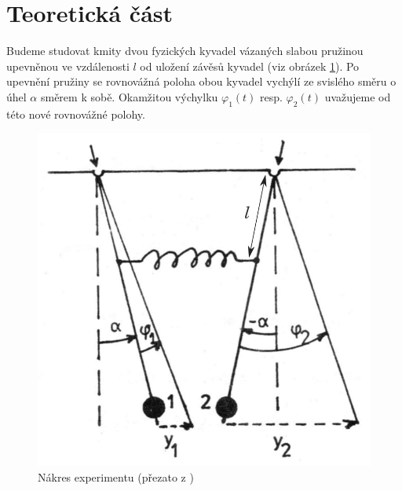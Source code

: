 \section*{Teoretická část}
Budeme studovat kmity dvou fyzických kyvadel vázaných slabou pružinou upevněnou ve vzdálenosti $l$ od uložení závěsů kyvadel (viz obrázek \ref{obr::aparatura}).
Po upevnění pružiny se rovnovážná poloha obou kyvadel vychýlí ze svislého směru o úhel $\alpha$ směrem k sobě.
Okamžitou výchylku $\varphi _1(t)$ resp. $\varphi _2 (t)$ uvažujeme od této nové rovnovážné polohy.

\begin{figure}[htbp]
\centering
\includegraphics[width=\textwidth-9cm]{graficos/aparatura}
\caption{Nákres experimentu (přezato z \cite{ZFP})}
\label{obr::aparatura}
\end{figure}


